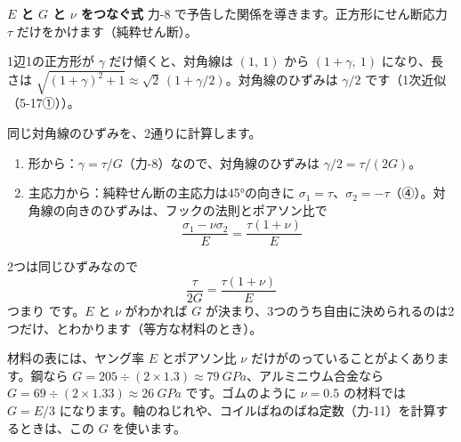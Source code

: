 \noindent\textbf{$E$ と $G$ と $\nu$ をつなぐ式}\quad
力-8 で予告した関係を導きます。正方形にせん断応力 $\tau$ だけをかけます（純粋せん断）。
\begin{bkfigure}
\noindent\begin{minipage}[c]{0.42\linewidth}\centering
{}
\end{minipage}\hfill
\begin{minipage}[c]{0.54\linewidth}\raggedright\small
1辺1の正方形が $\gamma$ だけ傾くと、対角線は $(1,\ 1)$ から $(1+\gamma,\ 1)$ になり、長さは $\sqrt{(1+\gamma)^2+1}\approx\sqrt2\,(1+\gamma/2)$。対角線のひずみは $\gamma/2$ です（1次近似（5-17①））。
\end{minipage}
\label{ph:力-9:fig-diag}
\end{bkfigure}
同じ対角線のひずみを、2通りに計算します。
\begin{enumerate}[label={\bkcircled{\arabic*}}, leftmargin=2.4\zw, itemsep=2pt, topsep=1pt]
\item 形から：$\gamma=\tau/G$（力-8）なので、対角線のひずみは $\gamma/2=\tau/(2G)$。
\item 主応力から：純粋せん断の主応力は45°の向きに $\sigma_1=\tau$、$\sigma_2=-\tau$（④）。対角線の向きのひずみは、フックの法則とポアソン比で
\[\frac{\sigma_1-\nu\sigma_2}{E}=\frac{\tau(1+\nu)}{E}\]
\end{enumerate}
2つは同じひずみなので
\[\frac{\tau}{2G}=\frac{\tau(1+\nu)}{E}\]
つまり
\label{ph:力-9:EG}です。$E$ と $\nu$ がわかれば $G$ が決まり、3つのうち自由に決められるのは2つだけ、とわかります（等方な材料のとき）。
\begin{phmijika}[ねじりの計算に要る $G$ を、表の $E$ と $\nu$ から]
材料の表には、ヤング率 $E$ とポアソン比 $\nu$ だけがのっていることがよくあります。鋼なら $G=205\div(2\times1.3)\approx\qty{79}{GPa}$、アルミニウム合金なら $G=69\div(2\times1.33)\approx\qty{26}{GPa}$ です。ゴムのように $\nu=0.5$ の材料では $G=E/3$ になります。軸のねじれや、コイルばねのばね定数（力-11）を計算するときは、この $G$ を使います。
\end{phmijika}

